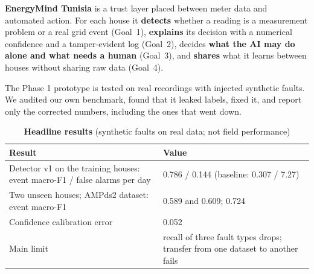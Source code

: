 \documentclass[10pt,a4paper]{article}
\newcommand{\hdr}{\rowcolor{black!12}}
\begin{document}
\textbf{EnergyMind Tunisia} is a trust layer placed between meter data and automated action. For each house it \textbf{detects} whether a reading is a measurement problem or a real grid event (Goal~1), \textbf{explains} its decision with a numerical confidence and a tamper-evident log (Goal~2), decides \textbf{what the AI may do alone and what needs a human} (Goal~3), and \textbf{shares} what it learns between houses without sharing raw data (Goal~4).

The Phase 1 prototype is tested on real recordings with injected synthetic faults. We audited our own benchmark, found that it leaked labels, fixed it, and report only the corrected numbers, including the ones that went down.

\begin{table}[!h]
\small\centering
\caption*{\textbf{Headline results} (synthetic faults on real data; not field performance)}
\begin{tabularx}{\textwidth}{@{}Yl@{}}
\toprule
\hdr \textbf{Result} & \textbf{Value}\\
\midrule
Detector v1 on the training houses: event macro-F1 / false alarms per day & 0.786 / 0.144 \quad(baseline: 0.307 / 7.27)\\
Two unseen houses; AMPds2 dataset: event macro-F1 & 0.589 and 0.609; 0.724\\
Confidence calibration error & 0.052\\
Main limit & recall of three fault types drops; transfer from one dataset to another fails\\
\bottomrule
\end{tabularx}
\end{table}
\end{document}

